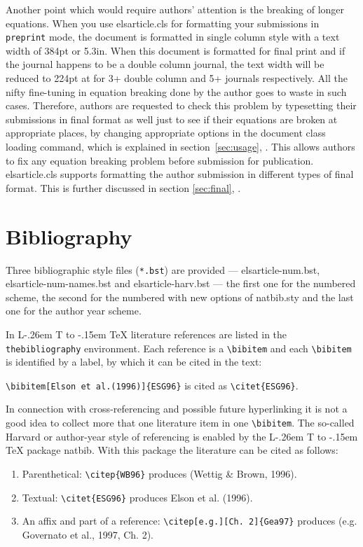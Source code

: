 \documentclass[a4paper,12pt]{article}
\makeatletter
\def\file#1{\textsf{#1}\xspace}
\DeclareRobustCommand{\LaTeX}{L\kern-.26em%
        {\sbox\z@ T%
         \vbox to\ht\z@{\hbox{\check@mathfonts
           \fontsize\sf@size\z@
           \math@fontsfalse\selectfont
          A\,}%
         \vss}%
        }%
     \kern-.15em%
    \TeX}
\makeatother
\begin{document}
Another point which would require authors' attention is the
breaking of longer equations.  When you use
\file{elsarticle.cls} for formatting your submissions in
\verb+preprint+ mode, the document is formatted in single column
style with a text width of 384pt or 5.3in.  When this document is
formatted for final print and if the journal happens to be a double column
journal, the text width will be reduced to 224pt at for 3+
double column and 5+ journals respectively. All the nifty 
fine-tuning in equation breaking done by the author goes to waste in
such cases.  Therefore, authors are requested to check this
problem by typesetting their submissions in final format as well
just to see if their equations are broken at appropriate places,
by changing appropriate options in the document class loading
command, which is explained in section~\ref{sec:usage},
. This allows authors to fix any equation breaking
problem before submission for publication.
\file{elsarticle.cls} supports formatting the author submission
in different types of final format.  This is further discussed in
section \ref{sec:final}, .

\section{Bibliography}
\hypertarget{bibliography}{}

Three bibliographic style files (\verb+*.bst+) are provided ---
\file{elsarticle-num.bst}, \file{elsarticle-num-names.bst} and
\file{elsarticle-harv.bst} --- the first one for the numbered scheme, the
second for the numbered with new options of \file{natbib.sty} and the
last one for the author year scheme.

In \LaTeX{} literature references are listed in the
\verb+thebibliography+ environment.  Each reference is a
\verb+\bibitem+ and each \verb+\bibitem+ is identified by a label,
by which it can be cited in the text:

\verb+\bibitem[Elson et al.(1996)]{ESG96}+ is cited as
\verb+\citet{ESG96}+. 

\noindent In connection with cross-referencing and
possible future hyperlinking it is not a good idea to collect
more that one literature item in one \verb+\bibitem+.  The
so-called Harvard or author-year style of referencing is enabled
by the \LaTeX{} package \file{natbib}. With this package the
literature can be cited as follows:

\begin{enumerate}[\textbullet]
\advance\itemsep4pt
\item Parenthetical: \verb+\citep{WB96}+ produces (Wettig \&
  Brown, 1996).
\item Textual: \verb+\citet{ESG96}+ produces Elson et al. (1996).
\item An affix and part of a reference:
\verb+\citep[e.g.][Ch. 2]{Gea97}+ produces (e.g. Governato et
al., 1997, Ch. 2).
\end{enumerate}
\end{document}

